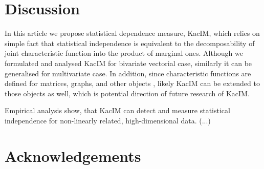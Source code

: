 \documentclass{article}
\begin{document}
\section{Discussion} 

\label{section:discussion}
In this article we propose statistical dependence measure, KacIM, which relies on simple fact that statistical independence is equivalent to the decomposability of joint characteristic function  into the product of marginal ones. Although we formulated and analysed KacIM for bivariate vectorial case, similarly it can be generalised for multivariate case. In addition, since characteristic functions are defined for matrices, graphs, and other objects \cite{?}, likely KacIM can be extended to those objects as well, which is potential direction of future research of KacIM.

Empirical analysis show, that KacIM can detect and measure statistical independence for non-linearly related, high-dimensional data. (...)

\section{Acknowledgements}




%


{\footnotesize
}


\end{document}
